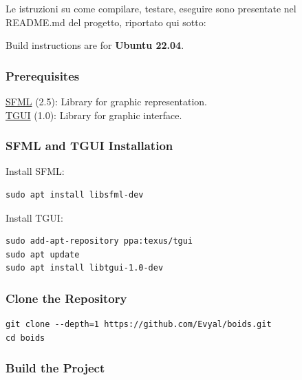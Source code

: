 \documentclass[10pt,a4paper]{article}
\begin{document}
Le istruzioni su come compilare, testare, eseguire sono presentate nel README.md del progetto, riportato qui sotto:

Build instructions are for \textbf{Ubuntu 22.04}.

\subsubsection{Prerequisites}

\href{https://github.com/SFML/SFML}{SFML} (2.5): Library for graphic representation. \\
\href{https://github.com/texus/TGUI}{TGUI} (1.0): Library for graphic interface.

\subsubsection{SFML and TGUI Installation}

Install SFML:

\begin{lstlisting}[style=github-bash]
sudo apt install libsfml-dev
\end{lstlisting}

Install TGUI:

\begin{lstlisting}[style=github-bash]
sudo add-apt-repository ppa:texus/tgui
sudo apt update
sudo apt install libtgui-1.0-dev
\end{lstlisting}

\subsubsection{Clone the Repository}

\begin{lstlisting}[style=github-bash]
git clone --depth=1 https://github.com/Evyal/boids.git
cd boids
\end{lstlisting}

\subsubsection{Build the Project}
\end{document}
